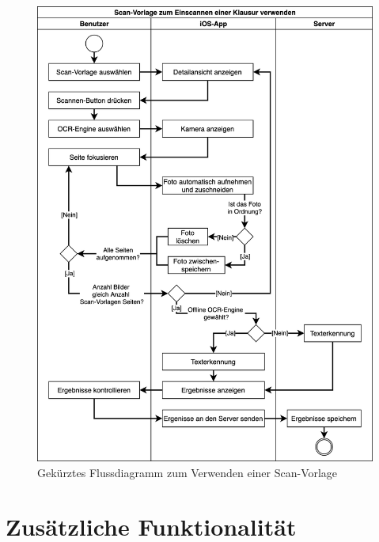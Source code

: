 \documentclass[notables, nomenclature, oneside, 150]{HSMW-Thesis}
\begin{document}
   	\begin{figure}[th]
   		\centering
   		\includegraphics[width=\textwidth,height=\textheight,keepaspectratio]{img/verwenden_flow}
   		\caption{Gekürztes Flussdiagramm zum Verwenden einer Scan-Vorlage}
   		\label{fig:verwenden_flow}
   	\end{figure}

	
\chapter{Zusätzliche Funktionalität} \label{ch:accses}
\end{document}
